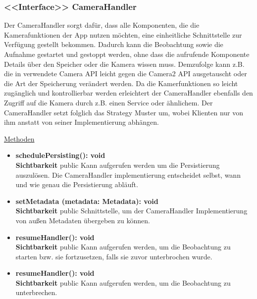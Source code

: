 \subsubsection{<<Interface>> CameraHandler} \label{app:klasse:CameraHandler}
Der CameraHandler sorgt dafür, dass alle Komponenten, die die Kamerafunktionen der App nutzen möchten, eine einheitliche Schnittstelle zur Verfügung gestellt bekommen. Dadurch kann die Beobachtung sowie die Aufnahme gestartet und gestoppt werden, ohne dass die aufrufende Komponente Details über den Speicher oder die Kamera wissen muss. Demzufolge kann z.B. die in  verwendete Camera API leicht gegen die Camera2 API ausgetauscht oder die Art der Speicherung verändert werden. Da die Kamerfunktionen so leicht zugänglich und kontrollierbar werden erleichtert der CameraHandler ebenfalls den Zugriff auf die Kamera durch z.B. einen Service oder ähnlichem. Der CameraHandler setzt folglich das Strategy Muster um, wobei Klienten nur von ihm anstatt von seiner Implementierung abhängen.
\newline

\underline{Methoden}
\begin{itemize}
\itemsep0pt

\item \textbf{schedulePersisting(): void}\hfill\\
\textbf{Sichtbarkeit} public\newline
Kann aufgerufen werden um die Persistierung auszulösen. Die CameraHandler implementierung entscheidet selbst, wann und wie genau die Persistierung abläuft.

\item \textbf{setMetadata (metadata: Metadata): void}\hfill\\
\textbf{Sichtbarkeit} public\newline
Schnittstelle, um der CameraHandler Implementierung von außen Metadaten übergeben zu können.

\item \textbf{resumeHandler(): void}\hfill\\
\textbf{Sichtbarkeit} public\newline
Kann aufgerufen werden, um die Beobachtung zu starten bzw. sie fortzusetzen, falls sie zuvor unterbrochen wurde.

\item \textbf{resumeHandler(): void}\hfill\\
\textbf{Sichtbarkeit} public\newline
Kann aufgerufen werden, um die Beobachtung zu unterbrechen.

\end{itemize}